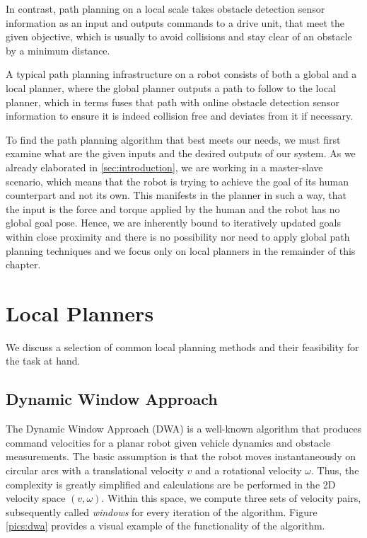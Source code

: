 In contrast, path planning on a local scale takes obstacle detection sensor information as an input and outputs commands to a drive unit, that meet the given objective, which is usually to avoid collisions and stay clear of an obstacle by a minimum distance. 

A typical path planning infrastructure on a robot consists of both a global and a local planner, where the global planner outputs a path to follow to the local planner, which in terms fuses that path with online obstacle detection sensor information to ensure it is indeed collision free and deviates from it if necessary.

To find the path planning algorithm that best meets our needs, we must first examine what are the given inputs and the desired outputs of our system. As we already elaborated in \cref{sec:introduction}, we are working in a master-slave scenario, which means that the robot is trying to achieve the goal of its human counterpart and not its own. This manifests in the planner in such a way, that the input is the force and torque applied by the human and the robot has no global goal pose. Hence, we are inherently bound to iteratively updated goals within close proximity and there is no possibility nor need to apply global path planning techniques and we focus only on local planners in the remainder of this chapter.

\section{Local Planners}
We discuss a selection of common local planning methods and their feasibility for the task at hand.

\subsection{Dynamic Window Approach}
The Dynamic Window Approach (DWA) \citep{fox1997dynamic} is a well-known algorithm that produces command velocities for a planar robot given vehicle dynamics and obstacle measurements. The basic assumption is that the robot moves instantaneously on circular arcs with a translational velocity $v$ and a rotational velocity $\omega$. Thus, the complexity is greatly simplified and calculations are be performed in the 2D velocity space $(v,\omega)$. Within this space, we compute three sets of velocity pairs,  subsequently called \emph{windows} for every iteration of the algorithm. Figure \ref{pics:dwa} provides a visual example of the functionality of the algorithm.

